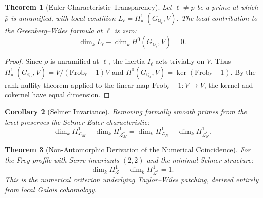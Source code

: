 \documentclass[12pt]{amsart}
\newtheorem{theorem}{Theorem}[section]
\newtheorem{corollary}[theorem]{Corollary}
\theoremstyle{definition}
\theoremstyle{remark}
\newcommand{\Frob}{\mathrm{Frob}}
\newcommand{\rhobar}{\bar{\rho}}
\newcommand{\GQl}{G_{\mathbb{Q}_\ell}}
\begin{document}
\begin{theorem}[Euler Characteristic Transparency]\label{thm:transparency}
Let $\ell \neq p$ be a prime at which $\rhobar$ is unramified, with local condition $L_\ell = H^1_{\mathrm{ur}}(\GQl, V)$. The local contribution to the Greenberg--Wiles formula at $\ell$ is zero:
$$\dim_k L_\ell - \dim_k H^0(\GQl, V) = 0.$$
\end{theorem}

\begin{proof}
Since $\rhobar$ is unramified at $\ell$, the inertia $I_\ell$ acts trivially on $V$. Thus $H^1_{\mathrm{ur}}(\GQl, V) = V / (\Frob_\ell - 1)V$ and $H^0(\GQl, V) = \ker(\Frob_\ell - 1)$. By the rank-nullity theorem applied to the linear map $\Frob_\ell - 1 : V \to V$, the kernel and cokernel have equal dimension.
\end{proof}

\begin{corollary}[Selmer Invariance]\label{cor:selmer-invariance}
Removing formally smooth primes from the level preserves the Selmer Euler characteristic:
$$\dim_k H^1_{\mathcal{L}_M} - \dim_k H^1_{\mathcal{L}_M^*} = \dim_k H^1_{\mathcal{L}_N} - \dim_k H^1_{\mathcal{L}_N^*}.$$
\end{corollary}

\begin{theorem}[Non-Automorphic Derivation of the Numerical Coincidence]\label{thm:numerical}
For the Frey profile with Serre invariants $(2, 2)$ and the minimal Selmer structure:
$$\dim_k H^1_{\mathcal{L}} - \dim_k H^1_{\mathcal{L}^*} = 1.$$
This is the numerical criterion underlying Taylor--Wiles patching, derived entirely from local Galois cohomology.
\end{theorem}
\end{document}
